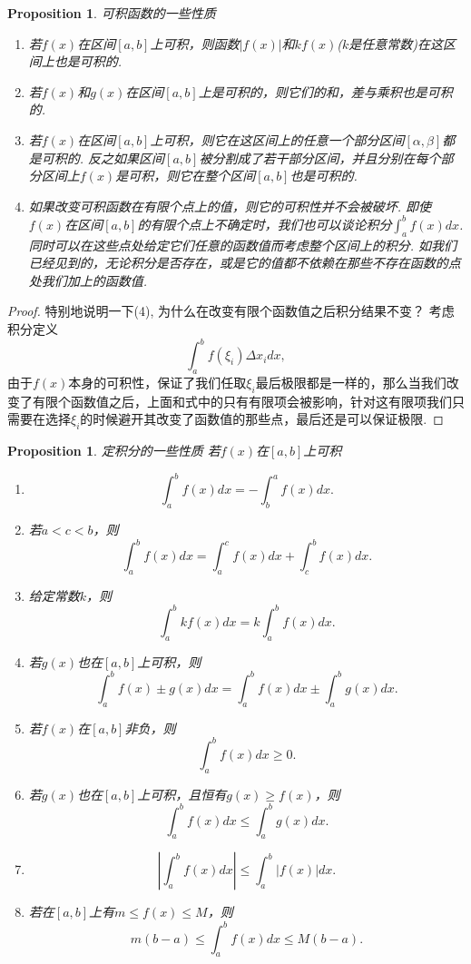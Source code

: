 \documentclass{article}
\newtheorem{proposition}[theorem]{Proposition}
\begin{document}
\begin{proposition}
\rm {\color{red}可积函数的一些性质}
\begin{enumerate}
	\item 若$f(x)$在区间$[a,b]$上可积，则函数$|f(x)|$和$kf(x)$($k$是任意常数)在这区间上也是可积的.
	\item 若$f(x)$和$g(x)$在区间$[a,b]$上是可积的，则它们的和，差与乘积也是可积的.
	\item 若$f(x)$在区间$[a,b]$上可积，则它在这区间上的任意一个部分区间$[\alpha,\beta]$都是可积的. 反之如果区间$[a,b]$被分割成了若干部分区间，并且分别在每个部分区间上$f(x)$是可积，则它在整个区间$[a,b]$也是可积的.
	\item 如果改变可积函数在有限个点上的值，则它的可积性并不会被破坏. {\color{blue} 即使$f(x)$在区间$[a,b]$的有限个点上不确定时，我们也可以谈论积分$\int_a^b f(x)dx$. 同时可以在这些点处给定它们任意的函数值而考虑整个区间上的积分. 如我们已经见到的，无论积分是否存在，或是它的值都不依赖在那些不存在函数的点处我们加上的函数值}.
\end{enumerate}
\end{proposition}

\begin{proof}
特别地说明一下(4), 为什么在{\color{red}改变有限个函数值之后积分结果不变}？ 考虑积分定义
$$
\int_a^b f(\xi_i)\Delta x_idx,
$$ 
由于$f(x)$本身的可积性，保证了我们任取$\xi_i$最后极限都是一样的，那么当我们改变了有限个函数值之后，上面和式中的只有有限项会被影响，针对这有限项我们只需要在选择$\xi_i$的时候避开其改变了函数值的那些点，最后还是可以保证极限.
\end{proof}

\begin{proposition}
\rm {\color{red}定积分的一些性质} 若$f(x)$在$[a,b]$上可积
\begin{enumerate}
	\item 
	$$
	\int_a^b f(x)dx = - \int_b^a f(x)dx.
	$$
	\item 若$a<c<b$，则
	$$
	\int_a^b f(x)dx  = \int_a^c f(x)dx + \int_c^b f(x)dx.
	$$
	\item 给定常数$k$，则
	$$
	\int_a^b kf(x)dx = k \int_a^b f(x)dx.
	$$
	\item 若$g(x)$也在$[a,b]$上可积，则
	$$
	\int_a^b f(x)\pm g(x)dx = \int_a^b f(x)dx \pm \int_a^b g(x)dx.
	$$
	\item 若$f(x)$在$[a,b]$非负，则
	$$
	\int_a^b f(x)dx \geq 0.
	$$
	\item 若$g(x)$也在$[a,b]$上可积，且恒有$g(x) \geq f(x)$，则
	$$
	\int_a^b f(x)dx \leq \int_a^b g(x)dx.
	$$
	\item 
	$$
	\left|\int_a^b f(x)dx\right| \leq \int_a^b |f(x)|dx.
	$$
	\item 若在$[a,b]$上有$m \leq f(x) \leq M$，则
	$$
	m(b-a) \leq \int_a^b f(x)dx \leq M(b-a).
	$$
\end{enumerate}
\end{proposition}
\end{document}

